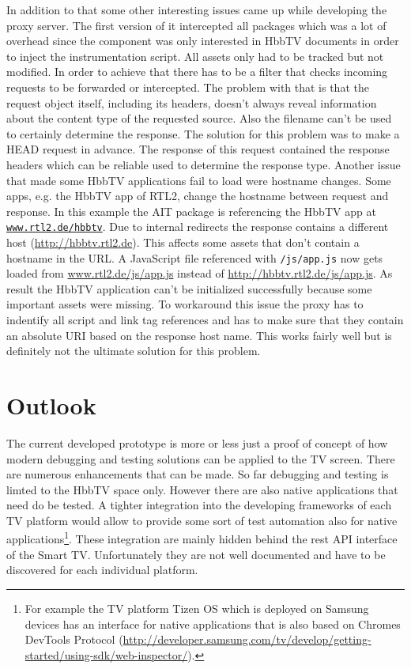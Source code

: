 In addition to that some other interesting issues came up while developing the proxy server. The first version of it
intercepted all packages which was a lot of overhead since the component was only interested in HbbTV documents in
order to inject the instrumentation script. All assets only had to be tracked but not modified. In order to achieve
that there has to be a filter that checks incoming requests to be forwarded or intercepted. The problem with that is
that the request object itself, including its headers, doesn't always reveal information about the content type of the
requested source. Also the filename can't be used to certainly determine the response. The solution for this problem
was to make a HEAD request in advance. The response of this request contained the response headers which can be
reliable used to determine the response type. Another issue that made some HbbTV applications fail to load were
hostname changes. Some apps, e.g. the HbbTV app of RTL2, change the hostname between request and response. In this
example the AIT package is referencing the HbbTV app at \texttt{\url{www.rtl2.de/hbbtv}}. Due to internal redirects
the response contains a different host (\url{http://hbbtv.rtl2.de}). This affects some assets that don't contain a
hostname in the URL. A JavaScript file referenced with \texttt{/js/app.js} now gets loaded from \url{www.rtl2.de/js/app.js}
instead of \url{http://hbbtv.rtl2.de/js/app.js}. As result the HbbTV application can't be initialized successfully
because some important assets were missing. To workaround this issue the proxy has to indentify all script and link tag
references and has to make sure that they contain an absolute URI based on the response host name. This works fairly
well but is definitely not the ultimate solution for this problem.

\section{Outlook\label{sec:outlook}}


The current developed prototype is more or less just a proof of concept of how modern debugging and testing solutions
can be applied to the TV screen. There are numerous enhancements that can be made. So far debugging and testing is
limted to the HbbTV space only. However there are also native applications that need do be tested. A tighter integration
into the developing frameworks of each TV platform would allow to provide some sort of test automation also for native
applications\footnote{For example the TV platform Tizen OS which is deployed on Samsung devices has an interface for
native applications that is also based on Chromes DevTools Protocol (\url{http://developer.samsung.com/tv/develop/getting-started/using-sdk/web-inspector/}).}.
These integration are mainly hidden behind the rest API interface of the Smart TV. Unfortunately they are not well
documented and have to be discovered for each individual platform.

